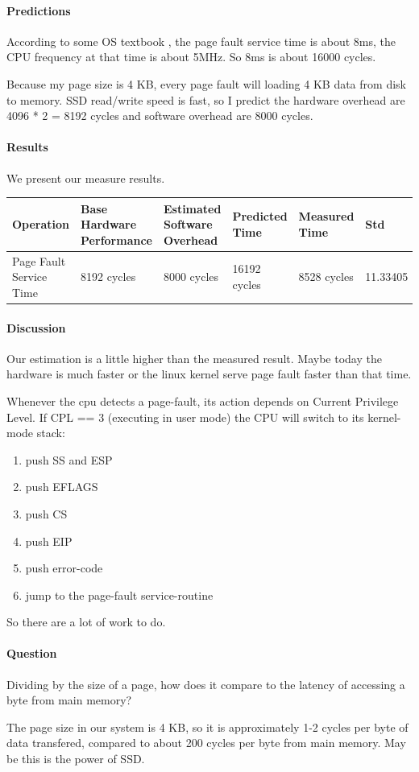 \paragraph{Predictions}
According to some OS textbook \cite{page}, the page fault service time is about 8ms, the CPU frequency at that time is about 5MHz. So 8ms is about 16000 cycles.

Because my page size is 4 KB, every page fault will loading 4 KB data from disk to memory. SSD read/write speed is fast, so I predict the hardware overhead are 4096 * 2 = 8192 cycles and software overhead are 8000 cycles.

\paragraph{Results}
We present our measure results.

\begin{center}
\begin{tabular}{| p{2cm} | p{3cm} | p{3cm} | p{2.5cm} | p{2.5cm} | p{2cm} }
Operation  & Base Hardware Performance  & Estimated Software Overhead  & Predicted Time  & Measured Time  & Std \\
\hline
Page Fault Service Time & 8192 cycles& 8000 cycles& 16192 cycles& 8528 cycles & 11.33405\\

\end{tabular}
\end{center}

\paragraph{Discussion}
Our estimation is a little higher than the measured result. Maybe today the hardware is much faster or the linux kernel serve page fault faster than that time.

Whenever the cpu detects a page-fault, its action depends on Current Privilege Level. If  CPL == 3  (executing in user mode)
the CPU will switch to its kernel-mode stack:

\begin{enumerate}
\item push  SS  and  ESP
\item push  EFLAGS
\item push  CS
\item push  EIP
\item push  error-code
\item jump to the page-fault service-routine  
\end{enumerate}

So there are a lot of work to do. 


\paragraph{Question} Dividing by the size of a page, how does it compare to the latency of accessing a byte from main memory?

The page size in our system is 4 KB, so it is approximately 1-2 cycles per byte of data transfered, compared to about 200 cycles per byte from main memory. May be this is the power of SSD.
